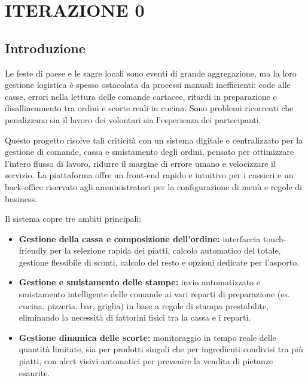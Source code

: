 \section{ITERAZIONE 0}

\subsection{Introduzione}

Le feste di paese e le sagre locali sono eventi di grande aggregazione, ma la loro
gestione logistica è spesso ostacolata da processi manuali inefficienti: code alle
casse, errori nella lettura delle comande cartacee, ritardi in preparazione e
disallineamento tra ordini e scorte reali in cucina. Sono problemi ricorrenti che
penalizzano sia il lavoro dei volontari sia l'esperienza dei partecipanti.

Questo progetto risolve tali criticità con un sistema digitale e centralizzato per
la gestione di comande, cassa e smistamento degli ordini, pensato per ottimizzare
l'intero flusso di lavoro, ridurre il margine di errore umano e velocizzare il
servizio. La piattaforma offre un front-end rapido e intuitivo per i cassieri e un
back-office riservato agli amministratori per la configurazione di menù e regole di
business.

Il sistema copre tre ambiti principali:
\begin{itemize}
    \item \textbf{Gestione della cassa e composizione dell'ordine:} interfaccia
          touch-friendly per la selezione rapida dei piatti, calcolo automatico
          del totale, gestione flessibile di sconti, calcolo del resto e opzioni
          dedicate per l'asporto.
    \item \textbf{Gestione e smistamento delle stampe:} invio automatizzato e
          smistamento intelligente delle comande ai vari reparti di preparazione
          (es. cucina, pizzeria, bar, griglia) in base a regole di stampa
          prestabilite, eliminando la necessità di fattorini fisici tra la cassa
          e i reparti.
    \item \textbf{Gestione dinamica delle scorte:} monitoraggio in tempo reale
          delle quantità limitate, sia per prodotti singoli che per ingredienti
          condivisi tra più piatti, con alert visivi automatici per prevenire
          la vendita di pietanze esaurite.
\end{itemize}

